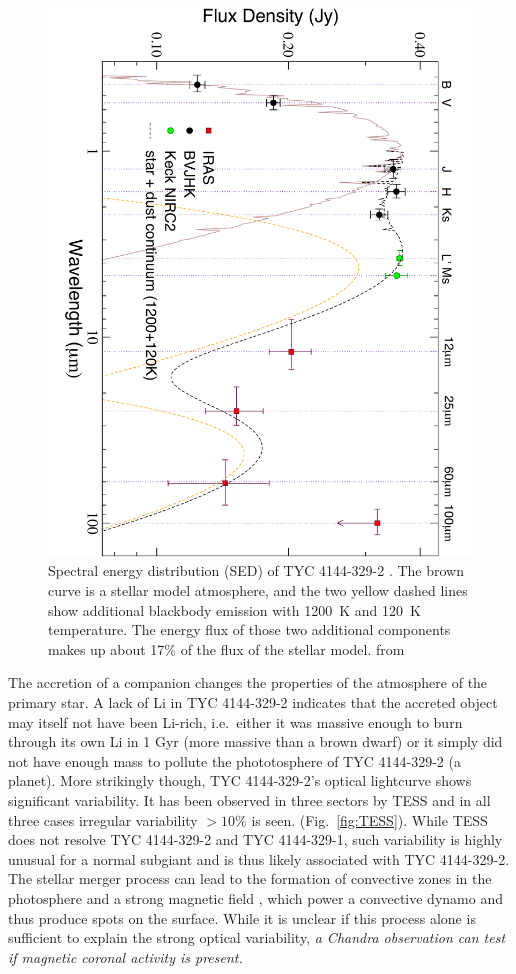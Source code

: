 \documentclass[letterpaper,11pt]{article}
\begin{document}
\begin{figure}
\includegraphics[width=.5\textwidth]{SED}
\caption{Spectral energy distribution (SED) of TYC 4144-329-2 . The brown curve is a stellar model atmosphere, and the two yellow dashed lines show additional blackbody emission with 1200~K and 120~K temperature. The energy flux of those two additional components makes up about 17\% of the flux of the stellar model. from \cite{2009ApJ...696.1964M} }
\label{fig:SED}
\end{figure}


The accretion of a companion changes the properties of the atmosphere of the primary star. A lack of Li in TYC 4144-329-2 \cite{2009ApJ...696.1964M} indicates that the accreted object may itself not have been Li-rich, i.e.\ either it was massive enough to burn through its own Li in 1 Gyr (more massive than a brown dwarf) or it simply did not have enough mass to pollute the phototosphere of TYC 4144-329-2 (a planet). More strikingly though, TYC 4144-329-2's optical lightcurve shows significant variability. It has been observed in three sectors by TESS and in all three cases irregular variability $>10\%$ is seen. (Fig.~\ref{fig:TESS}). While TESS does not resolve TYC 4144-329-2 and TYC 4144-329-1, such variability is highly unusual for a normal subgiant and is thus likely associated with TYC 4144-329-2. The stellar merger process can lead to the formation of convective zones in the photosphere \cite{Soker&Tylenda2007} and a strong magnetic field \cite{Schneider+2016}, which power a convective dynamo and thus produce spots on the surface. While it is unclear if this process alone is sufficient to explain the strong optical variability, \textit{a Chandra observation can test if magnetic coronal activity is present.}
\end{document}
